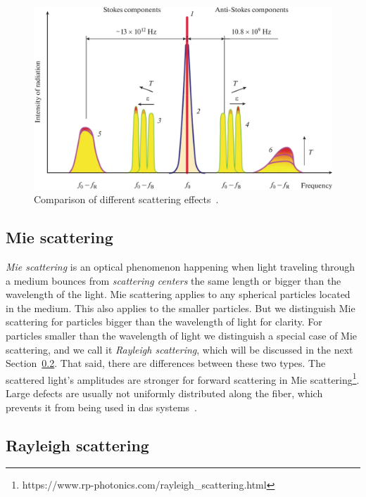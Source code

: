 \begin{figure}
    \centering
    \includegraphics[width=\linewidth]{obrazky/scatterings.png}
    \caption{Comparison of different scattering effects~\cite{scattering.comparison}.}
    \label{fig:scattering.comparison}
\end{figure}

\subsection{Mie scattering}\label{txt.scattering.mie}

\textit{Mie scattering} is an optical phenomenon happening when light traveling through a medium bounces from \textit{scattering centers} the same length or bigger than the wavelength of the light. Mie scattering applies to any spherical particles located in the medium. This also applies to the smaller particles. But we distinguish Mie scattering for particles bigger than the wavelength of light for clarity. For particles smaller than the wavelength of light we distinguish a special case of Mie scattering, and we call it \textit{Rayleigh scattering}, which will be discussed in the next Section~\ref{txt.scattering.ray}. That said, there are differences between these two types. The scattered light's amplitudes are stronger for forward scattering in Mie scattering\footnote{https://www.rp-photonics.com/rayleigh\_scattering.html}. Large defects are usually not uniformly distributed along the fiber, which prevents it from being used in \ac{das} systems~\cite{dasKislov}.

\subsection{Rayleigh scattering}\label{txt.scattering.ray}

